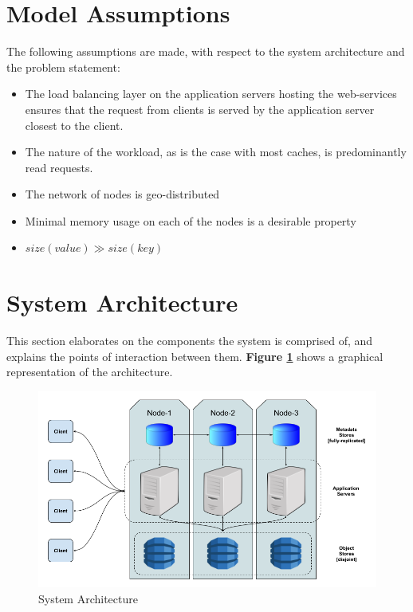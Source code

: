 \documentclass{sig-alternate}
\begin{document}
\section{Model Assumptions}
The following assumptions are made, with respect to the system architecture and the problem statement:
\begin{itemize}
	\item The load balancing layer on the application servers hosting the web-services ensures that the request from clients is served by the application server closest to the client. 
	\item The nature of the workload, as is the case with most caches, is predominantly read requests.
	\item The network of nodes is geo-distributed
	\item Minimal memory usage on each of the nodes is a desirable property
	\item $\displaystyle size(value) \gg size(key)$
\end{itemize}


\section{System Architecture}
This section elaborates on the components the system is comprised of, and explains the points of interaction between them. \textbf{Figure \ref{fig:sysarch}} shows a graphical representation of the architecture.\\

\begin{figure}
\centering
\includegraphics[width=\textwidth]{images/SystemArchitecture.png}
\caption{System Architecture}
\label{fig:sysarch}
\end{figure}
\end{document}

